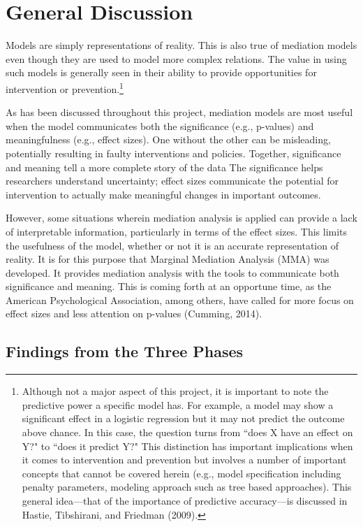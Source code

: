 \documentclass[]{DissertateUSU}
\let\rmarkdownfootnote\footnote%
\def\footnote{\protect\rmarkdownfootnote}
\begin{document}
\doublespacing

\section{General Discussion}\label{general-discussion}

Models are simply representations of reality. This is also true of
mediation models even though they are used to model more complex
relations. The value in using such models is generally seen in their
ability to provide opportunities for intervention or
prevention.\footnote{Although not a major aspect of this project, it is important to note the predictive power a specific model has. For example, a model may show a significant effect in a logistic regression but it may not predict the outcome above chance. In this case, the question turns from ``does X have an effect on Y?" to ``does it predict Y?" This distinction has important implications when it comes to intervention and prevention but involves a number of important concepts that cannot be covered herein (e.g., model specification including penalty parameters, modeling approach such as tree based approaches). This general idea---that of the importance of predictive accuracy---is discussed in Hastie, Tibshirani, and Friedman (2009).}

As has been discussed throughout this project, mediation models are most
useful when the model communicates both the significance (e.g.,
p-values) and meaningfulness (e.g., effect sizes). One without the other
can be misleading, potentially resulting in faulty interventions and
policies. Together, significance and meaning tell a more complete story
of the data The significance helps researchers understand uncertainty;
effect sizes communicate the potential for intervention to actually make
meaningful changes in important outcomes.

However, some situations wherein mediation analysis is applied can
provide a lack of interpretable information, particularly in terms of
the effect sizes. This limits the usefulness of the model, whether or
not it is an accurate representation of reality. It is for this purpose
that Marginal Mediation Analysis (MMA) was developed. It provides
mediation analysis with the tools to communicate both significance and
meaning. This is coming forth at an opportune time, as the American
Psychological Association, among others, have called for more focus on
effect sizes and less attention on p-values (Cumming, 2014).

\subsection{Findings from the Three
Phases}\label{findings-from-the-three-phases}
\end{document}
